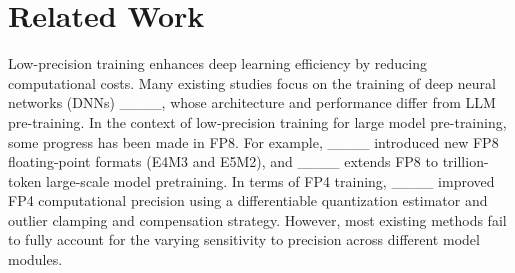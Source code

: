 \section{Related Work}
Low-precision training enhances deep learning efficiency by reducing computational costs. Many existing studies focus on the training of deep neural networks (DNNs) ____, whose architecture and performance differ from LLM pre-training. %
In the context of low-precision training for large model pre-training, some progress has been made in FP8. For example, ____ introduced new FP8 floating-point formats (E4M3 and E5M2), %
and ____ extends FP8 to trillion-token large-scale model pretraining. In terms of FP4 training, ____ improved FP4 computational precision using a differentiable quantization estimator and outlier clamping and compensation strategy. However, most existing methods fail to fully account for the varying sensitivity to precision across different model modules.

